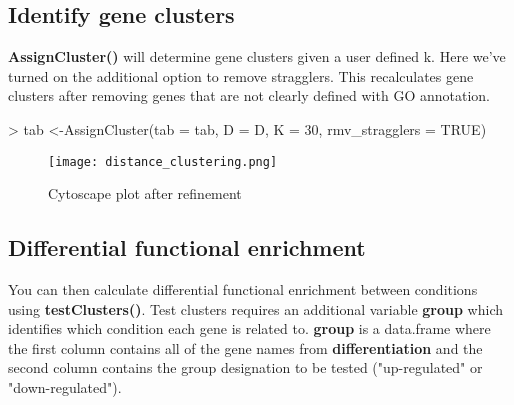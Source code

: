 \documentclass{article}
\begin{document}
\subsection*{Identify gene clusters}
\textbf{AssignCluster()} will determine gene clusters given a user defined k. Here we've turned on the additional option to remove stragglers. This recalculates gene clusters after removing genes that are not clearly defined with GO annotation.
\vspace{5mm}
\begin{Schunk}
\begin{Sinput}
> tab <-AssignCluster(tab = tab, D = D, K = 30, rmv_stragglers = TRUE)
\end{Sinput}
\end{Schunk}
\begin{figure}[ht]
\texttt{[image: distance\_clustering.png]}
\centering
\caption{Cytoscape plot after refinement}
\end{figure}

\subsection*{Differential functional enrichment}
You can then calculate differential functional enrichment between conditions using \textbf{testClusters()}. Test clusters requires an additional variable \textbf{group} which identifies which condition each gene is related to. \textbf{group} is a data.frame where the first column contains all of the gene names from \textbf{differentiation} and the second column contains the group designation to be tested ("up-regulated" or "down-regulated").
\end{document}
